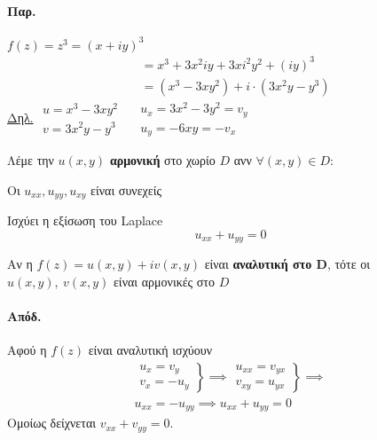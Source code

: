 \documentclass[12pt,a4paper,notitlepage,fleqn]{article}
\begin{document}
	\paragraph{Παρ.}
	\( f(z) = z^3 = (x+iy)^3 \)
	\begin{align*}
		&= x^3+3x^2iy+3xi^2y^2+(iy)^3 \\
		&= (x^3-3xy^2) + i \cdot (3x^2y-y^3)
	\end{align*}
	\underline{Δηλ.} \(
	\begin{array}{l}
	u=x^3-3xy^2 \\ v=3x^2y-y^3
	\end{array} \quad \begin{array}{l}
	u_x = 3x^2-3y^2 = v_y \\
	u_y = -6xy = - v_x
	\end{array}
	 \)

	\begin{defn*}{}
		Λέμε την \( u(x,y) \) \textbf{αρμονική} στο χωρίο \( D \) ανν \( \forall (x,y)\in D\):
		\begin{enumgreekparen}
			\item Οι \( u_{xx},u_{yy},u_{xy} \) είναι συνεχείς
			\item Ισχύει η εξίσωση του Laplace \[
			\boxed{u_{xx} + u_{yy} = 0}
			\]
		\end{enumgreekparen}
	\end{defn*}

	\begin{theorem*}{}
		Αν η \( f(z) = u(x,y)+iv(x,y) \) είναι \textbf{αναλυτική στο \( \mathbf D \)}, τότε
		οι \( u(x,y),\ v(x,y) \) είναι αρμονικές στο \( D \)
	\end{theorem*}
	\paragraph{Απόδ.}
	Αφού η \( f(z) \) είναι αναλυτική ισχύουν
	\begin{gather*} \left.
		\begin{array}{l}
		u_x = v_y \\ v_x = -u_y
		\end{array} \right\rbrace \implies \left. \begin{array}{l}
		u_{xx} = v_{yx} \\ v_{xy} = u_{yx}
		\end{array} \right\rbrace \implies \\
		u_{xx} = - u_{yy} \implies u_{xx}+u_{yy} = 0
			\end{gather*}
		Ομοίως δείχνεται \( v_{xx} + v_{yy} = 0 \).
\end{document}
